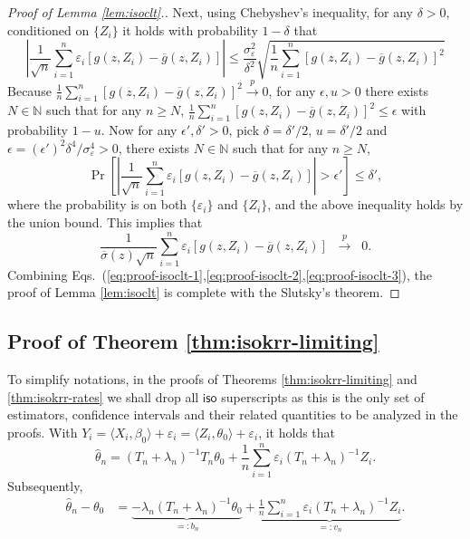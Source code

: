 \documentclass[11pt,a4paper]{article}
\renewcommand{\hat}{\widehat}
\renewcommand{\bar}{\overline}
\theoremstyle{definition}
\theoremstyle{plain}
\theoremstyle{remark}
\newcommand{\iso}{\mathsf{iso}}
\begin{document}
\begin{proof}[Proof of Lemma \ref{lem:isoclt}.]
Next, using Chebyshev's inequality, for any $\delta>0$, conditioned on $\{Z_i\}$ it holds with probability $1-\delta$ that
$$
\left|\frac{1}{\sqrt{n}}\sum_{i=1}^n\varepsilon_i[g(z,Z_i)-\bar g(z,Z_i)]\right| \leq \frac{\sigma_\varepsilon^2}{\delta^2}\sqrt{\frac{1}{n}\sum_{i=1}^n[g(z,Z_i)-\bar g(z,Z_i)]^2} 
$$
Because $\frac{1}{n}\sum_{i=1}^n[g(z,Z_i)-\bar g(z,Z_i)]^2\overset{p}{\to}0$, for any $\epsilon,u>0$ there exists $N\in\mathbb N$ such that for any $n\geq N$, $\frac{1}{n}\sum_{i=1}^n[g(z,Z_i)-\bar g(z,Z_i)]^2\leq\epsilon$
with probability $1-u$.
Now for any $\epsilon',\delta'>0$, pick $\delta=\delta'/2$, $u=\delta'/2$ and $\epsilon=(\epsilon')^2\delta^4/\sigma_\varepsilon^4>0$, there exists $N\in\mathbb N$ such that for any $n\geq N$, 
$$
\Pr\left[\left|\frac{1}{\sqrt{n}}\sum_{i=1}^n\varepsilon_i[g(z,Z_i)-\bar g(z,Z_i)]\right|>\epsilon'\right]\leq\delta',
$$
where the probability is on both $\{\varepsilon_i\}$ and $\{Z_i\}$, and the above inequality holds by the union bound.
This implies that
\begin{equation}
\frac{1}{\bar\sigma(z)\sqrt{n}}\sum_{i=1}^n\varepsilon_i[g(z,Z_i)-\bar g(z,Z_i)] \;\;\overset{p}{\to}\;\; 0.
\label{eq:proof-isoclt-3}
\end{equation}
Combining Eqs.~(\ref{eq:proof-isoclt-1},\ref{eq:proof-isoclt-2},\ref{eq:proof-isoclt-3}), the proof of Lemma \ref{lem:isoclt} is complete with the Slutsky's theorem.
\end{proof}


\subsection{Proof of Theorem \ref{thm:isokrr-limiting}}

To simplify notations, in the proofs of Theorems \ref{thm:isokrr-limiting} and \ref{thm:isokrr-rates} we shall drop all $\iso$ superscripts as this is the only set of estimators, confidence intervals and their related
quantities to be analyzed in the proofs.
With $Y_i=\langle X_i,\beta_0\rangle+\varepsilon_i = \langle Z_i,\theta_0\rangle+\varepsilon_i$, it holds that
$$
\hat\theta_n = (T_n+\lambda_n)^{-1}T_n\theta_0 + \frac{1}{n}\sum_{i=1}^n\varepsilon_i (T_n+\lambda_n)^{-1}Z_i.
$$
Subsequently,
\begin{align}
\hat\theta_n-\theta_0 &= \underbrace{-\lambda_n (T_n+\lambda_n)^{-1}\theta_0}_{=: b_n} + \underbrace{\frac{1}{n}\sum_{i=1}^n\varepsilon_i(T_n+\lambda_n)^{-1}Z_i}_{=:v_n}.
\end{align}
\end{document}

